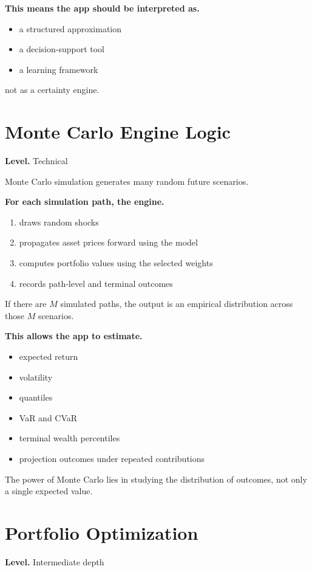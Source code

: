 \documentclass[11pt]{report}
\begin{document}
\textbf{This means the app should be interpreted as.}

\begin{itemize}
\item a structured approximation
\item a decision-support tool
\item a learning framework
\end{itemize}

not as a certainty engine.

\section{Monte Carlo Engine Logic}
\begin{callout}
\textbf{Level.} Technical
\end{callout}

Monte Carlo simulation generates many random future scenarios.

\textbf{For each simulation path, the engine.}

\begin{enumerate}
\item draws random shocks
\item propagates asset prices forward using the model
\item computes portfolio values using the selected weights
\item records path-level and terminal outcomes
\end{enumerate}

If there are $M$ simulated paths, the output is an empirical distribution across those $M$ scenarios.

\textbf{This allows the app to estimate.}

\begin{itemize}
\item expected return
\item volatility
\item quantiles
\item VaR and CVaR
\item terminal wealth percentiles
\item projection outcomes under repeated contributions
\end{itemize}

The power of Monte Carlo lies in studying the distribution of outcomes, not only a single expected value.

\section{Portfolio Optimization}
\begin{callout}
\textbf{Level.} Intermediate depth
\end{callout}
\end{document}
